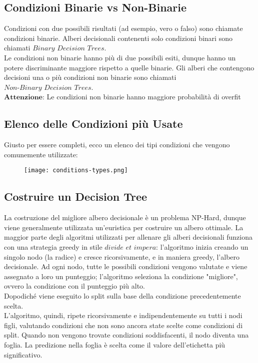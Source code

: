     \subsection{Condizioni Binarie vs Non-Binarie}
        Condizioni con due possibili risultati (ad esempio, vero o falso) sono chiamate condizioni binarie.
        Alberi decisionali contenenti solo condizioni binari sono chiamati $\textit{Binary Decision Trees}$.
        \\[1\baselineskip]
        Le condizioni non binarie hanno più di due possibili esiti, dunque hanno un potere discriminante maggiore rispetto a quelle binarie.
        Gli alberi che contengono decisioni una o più condizioni non binarie sono chiamati $\textit{Non-Binary Decision Trees}$.
        \\[1\baselineskip]
        $\textbf{Attenzione}$: Le condizioni non binarie hanno maggiore probabilità di overfit
        
    \subsection{Elenco delle Condizioni più Usate}
        Giusto per essere completi, ecco un elenco dei tipi condizioni che vengono comunemente utilizzate:

        \begin{figure}[h]
            \centering
            \texttt{[image: conditions-types.png]}
        \end{figure}
    
    \clearpage

    \subsection{Costruire un Decision Tree}
        La costruzione del migliore albero decisionale è un problema NP-Hard, dunque viene generalmente utilizzata un'euristica per costruire un albero ottimale.
        La maggior parte degli algoritmi utilizzati per allenare gli alberi decisionali funziona con una strategia greedy in stile $\textit{divide et impera}$: l'algoritmo inizia creando un singolo nodo (la radice) e cresce ricorsivamente, e in maniera greedy, l'albero decisionale.
        Ad ogni nodo, tutte le possibili condizioni vengono valutate e viene assegnato a loro un punteggio; l'algoritmo seleziona la condizione "migliore", ovvero la condizione con il punteggio più alto.\\
        Dopodiché viene eseguito lo split sulla base della condizione precedentemente scelta.
        \\[1\baselineskip]
        L'algoritmo, quindi, ripete ricorsivamente e indipendentemente su tutti i nodi figli, valutando condizioni che non sono ancora state scelte come condizioni di split.
        Quando non vengono trovate condizioni soddisfacenti, il nodo diventa una foglia.
        La predizione nella foglia è scelta come il valore dell'etichetta più significativo.

